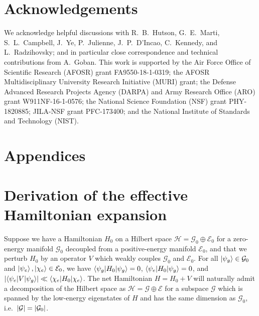 \documentclass[preprint,showkeys,nofootinbib]{revtex4-1}
\newcommand{\bk}{\braket} %
\newcommand{\E}{\mathcal{E}}
\newcommand{\G}{\mathcal{G}}
\renewcommand{\H}{\mathcal{H}}
\newcommand{\1}{\mathds{1}}
\begin{document}

\section*{Acknowledgements}

We acknowledge helpful discussions with R.~B.~Hutson, G.~E.~Marti,
S.~L.~Campbell, J.~Ye, P.~Julienne, J.~P.~D'Incao, C.~Kennedy, and
L.~Radzihovsky; and in particular close correspondence and technical
contributions from A.~Goban.  This work is supported by the Air Force
Office of Scientific Research (AFOSR) grant FA9550-18-1-0319; the
AFOSR Multidisciplinary University Research Initiative (MURI) grant;
the Defense Advanced Research Projects Agency (DARPA) and Army
Research Office (ARO) grant W911NF-16-1-0576; the National Science
Foundation (NSF) grant PHY-1820885; JILA-NSF grant PFC-173400; and the
National Institute of Standards and Technology (NIST).



\section*{Appendices}
\appendix

\section{Derivation of the effective Hamiltonian expansion}
\label{sec:eff_derivation}

Suppose we have a Hamiltonian $H_0$ on a Hilbert space
$\H=\G_0\oplus\E_0$ for a zero-energy manifold $\G_0$ decoupled from a
positive-energy manifold $\E_0$, and that we perturb $H_0$ by an
operator $V$ which weakly couples $\G_0$ and $\E_0$.  For all
$\ket{\psi_g}\in\G_0$ and $\ket{\psi_e},\ket{\chi_e}\in\E_0$, we have
$\bk{\psi_g|H_0|\psi_g}=0$, $\bk{\psi_e|H_0|\psi_g}=0$, and
$\abs{\bk{\psi_e|V|\psi_g}}\ll\bk{\chi_e|H_0|\chi_e}$.  The net
Hamiltonian $H=H_0+V$ will naturally admit a decomposition of the
Hilbert space as $\H=\G\oplus\E$ for a subspace $\G$ which is spanned
by the low-energy eigenstates of $H$ and has the same dimension as
$\G_0$, i.e.~$\abs{\G}=\abs{\G_0}$.
\end{document}

